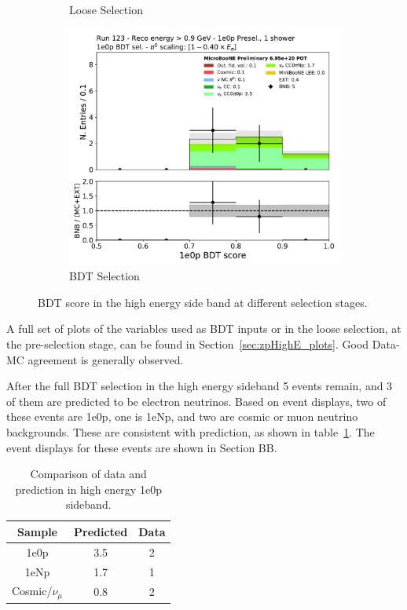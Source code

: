 \begin{figure}[H]
\begin{subfigure}{0.3\textwidth}
    \caption{Loose Selection}
    \end{subfigure}
    \begin{subfigure}{0.3\textwidth}
    \includegraphics[width=1.0\textwidth]{1e0p/High_E_Sideband/BDT_selection/bkg_score_high_bdt.pdf}
    \caption{BDT Selection}
    \end{subfigure}
    \caption{BDT score in the high energy side band at different selection stages.} 
    \label{fig:1e0p:High_E_sideband:bdtscore}
\end{figure}

A full set of plots of the variables used as BDT inputs or in the loose selection, at the pre-selection stage, can be found in Section~\ref{sec:zpHighE_plots}. Good Data-MC agreement is generally observed. 

After the full BDT selection in the high energy sideband 5 events remain, and 3 of them are predicted to be electron neutrinos.  Based on event displays, two of these events are 1e0p, one is 1eNp, and two are cosmic or muon neutrino backgrounds.  These are consistent with prediction, as shown in table~\ref{tab:1e0p:High_E_sideband:comparedatamc}.  The event displays for these events are shown in Section BB.

\begin{table}[h!]
\centering
\begin{center}
\begin{tabular}{ c|c|c } 
Sample& Predicted & Data \\ 
\hline \hline
  1e0p&3.5&2   \\ 
  1eNp&1.7&1  \\ 
  Cosmic/$\nu_{\mu}$ & 0.8 & 2 \\
 \hline \hline
\end{tabular}
\end{center}
\caption{Comparison of data and prediction in high energy 1e0p sideband.}
\label{tab:1e0p:High_E_sideband:comparedatamc}
\end{table}

